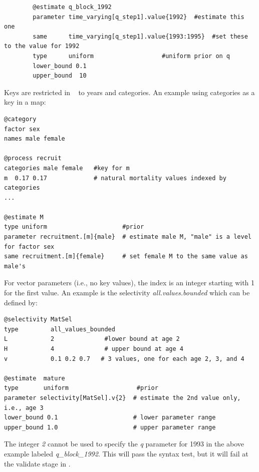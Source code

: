 {\small{\begin{verbatim}
		@estimate q_block_1992
		parameter time_varying[q_step1].value{1992}  #estimate this one
		same      time_varying[q_step1].value{1993:1995}  #set these to the value for 1992
		type      uniform                   #uniform prior on q
		lower_bound 0.1 
		upper_bound  10  
\end{verbatim}}}

Keys are restricted in \CNAME~ to years and categories. An example using categories as a key in a map:

{\small{\begin{verbatim}
@category
factor sex
names male female

@process recruit
categories male female   #key for m
m  0.17 0.17             # natural mortality values indexed by categories
...

@estimate M
type uniform                     #prior
parameter recruitment.[m]{male}  # estimate male M, "male" is a level for factor sex
same recruitment.[m]{female}     # set female M to the same value as male's
\end{verbatim}}}
	
For vector parameters (i.e., no key values), the index is an integer starting with 1 for the first value. An example is the selectivity \textit{all.values.bounded} which can be defined by:

{\small{\begin{verbatim}
@selectivity MatSel
type         all_values_bounded
L            2              #lower bound at age 2
H            4              # upper bound at age 4
v            0.1 0.2 0.7   # 3 values, one for each age 2, 3, and 4

@estimate  mature
type       uniform                   #prior
parameter selectivity[MatSel].v{2}  # estimate the 2nd value only, i.e., age 3
lower_bound 0.1                     # lower parameter range
upper_bound 1.0                     # upper parameter range
\end{verbatim}}}
	
The integer \textit{{2}} cannot be used to specify the \textit{q} parameter for 1993 in the above example labeled \textit{q\_block\_1992}. This will pass the syntax test, but it will fail at the validate stage in \CNAME.


\paragraph*{\label{sec:declare}}


